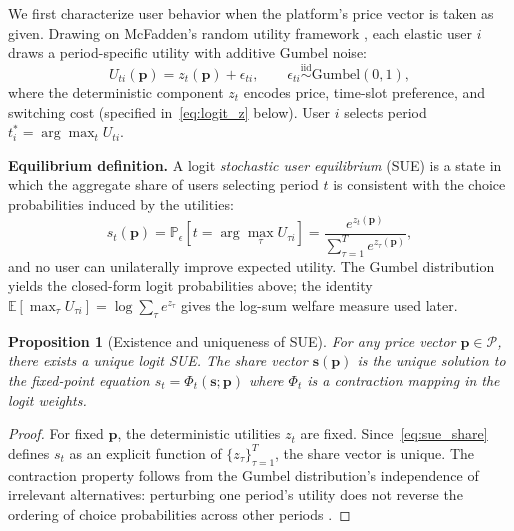 \documentclass[11pt]{article}
\newtheorem{proposition}{Proposition}
\begin{document}
We first characterize user behavior when the platform's price vector is
taken as given. Drawing on McFadden's random utility framework
\cite{mcfadden1974conditional}, each elastic user $i$ draws a
period-specific utility with additive Gumbel noise:
\begin{equation}
  U_{ti}(\boldsymbol{p}) = z_t(\boldsymbol{p}) + \epsilon_{ti},
  \qquad \epsilon_{ti} \overset{\mathrm{iid}}{\sim} \mathrm{Gumbel}(0,1),
  \label{eq:gumbel_utility}
\end{equation}
where the deterministic component $z_t$ encodes price, time-slot preference,
and switching cost (specified in~\eqref{eq:logit_z} below). User $i$ selects
period $t_i^* = \arg\max_t U_{ti}$.

\textbf{Equilibrium definition.} A logit {\em stochastic user equilibrium}
(SUE) \cite{daganzo1979multinomial,anderson1992discrete} is a state in which
the aggregate share of users selecting period $t$ is consistent with the
choice probabilities induced by the utilities:
\begin{equation}
  s_t(\boldsymbol{p}) =
  \mathbb{P}_\epsilon\left[t = \arg\max_{\tau} U_{\tau i}\right]
  = \frac{e^{z_t(\boldsymbol{p})}}{\sum_{\tau=1}^{T} e^{z_\tau(\boldsymbol{p})}},
  \label{eq:sue_share}
\end{equation}
and no user can unilaterally improve expected utility. The Gumbel
distribution yields the closed-form logit probabilities above; the identity
$\mathbb{E}[\max_\tau U_{\tau i}] = \log\sum_\tau e^{z_\tau}$ gives the
log-sum welfare measure used later.

\begin{proposition}[Existence and uniqueness of SUE]
  \label{prop:sue}
  For any price vector $\boldsymbol{p}\in\mathcal{P}$, there exists a unique
  logit SUE. The share vector $\boldsymbol{s}(\boldsymbol{p})$ is the unique
  solution to the fixed-point equation
  $s_t = \Phi_t(\boldsymbol{s}; \boldsymbol{p})$ where $\Phi_t$ is a
  contraction mapping in the logit weights.
\end{proposition}

\begin{proof}
  For fixed $\boldsymbol{p}$, the deterministic utilities $z_t$ are fixed.
  Since~\eqref{eq:sue_share} defines $s_t$ as an explicit function of
  $\{z_\tau\}_{\tau=1}^T$, the share vector is unique. The contraction
  property follows from the Gumbel distribution's independence of
  irrelevant alternatives: perturbing one period's utility does not reverse
  the ordering of choice probabilities across other periods
  \cite{train2009discrete}.
\end{proof}
\end{document}

